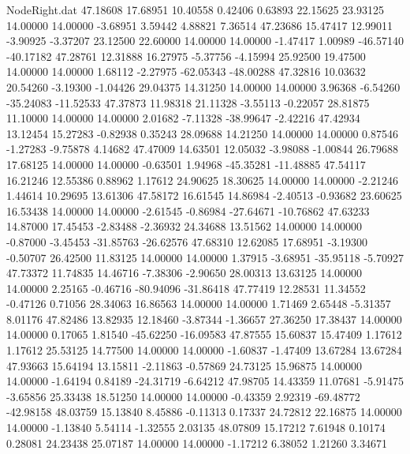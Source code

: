 \begin{filecontents}{NodeRight.dat}
  47.18608   17.68951   10.40558     0.42406    0.63893   22.15625   23.93125   14.00000   14.00000   -3.68951    3.59442    4.88821    7.36514
  47.23686   15.47417   12.99011    -3.90925   -3.37207   23.12500   22.60000   14.00000   14.00000   -1.47417    1.00989  -46.57140  -40.17182
  47.28761   12.31888   16.27975    -5.37756   -4.15994   25.92500   19.47500   14.00000   14.00000    1.68112   -2.27975  -62.05343  -48.00288
  47.32816   10.03632   20.54260    -3.19300   -1.04426   29.04375   14.31250   14.00000   14.00000    3.96368   -6.54260  -35.24083  -11.52533
  47.37873   11.98318   21.11328    -3.55113   -0.22057   28.81875   11.10000   14.00000   14.00000    2.01682   -7.11328  -38.99647   -2.42216
  47.42934   13.12454   15.27283    -0.82938    0.35243   28.09688   14.21250   14.00000   14.00000    0.87546   -1.27283   -9.75878    4.14682
  47.47009   14.63501   12.05032    -3.98088   -1.00844   26.79688   17.68125   14.00000   14.00000   -0.63501    1.94968  -45.35281  -11.48885
  47.54117   16.21246   12.55386     0.88962    1.17612   24.90625   18.30625   14.00000   14.00000   -2.21246    1.44614   10.29695   13.61306
  47.58172   16.61545   14.86984    -2.40513   -0.93682   23.60625   16.53438   14.00000   14.00000   -2.61545   -0.86984  -27.64671  -10.76862
  47.63233   14.87000   17.45453    -2.83488   -2.36932   24.34688   13.51562   14.00000   14.00000   -0.87000   -3.45453  -31.85763  -26.62576
  47.68310   12.62085   17.68951    -3.19300   -0.50707   26.42500   11.83125   14.00000   14.00000    1.37915   -3.68951  -35.95118   -5.70927
  47.73372   11.74835   14.46716    -7.38306   -2.90650   28.00313   13.63125   14.00000   14.00000    2.25165   -0.46716  -80.94096  -31.86418
  47.77419   12.28531   11.34552    -0.47126    0.71056   28.34063   16.86563   14.00000   14.00000    1.71469    2.65448   -5.31357    8.01176
  47.82486   13.82935   12.18460    -3.87344   -1.36657   27.36250   17.38437   14.00000   14.00000    0.17065    1.81540  -45.62250  -16.09583
  47.87555   15.60837   15.47409     1.17612    1.17612   25.53125   14.77500   14.00000   14.00000   -1.60837   -1.47409   13.67284   13.67284
  47.93663   15.64194   13.15811    -2.11863   -0.57869   24.73125   15.96875   14.00000   14.00000   -1.64194    0.84189  -24.31719   -6.64212
  47.98705   14.43359   11.07681    -5.91475   -3.65856   25.33438   18.51250   14.00000   14.00000   -0.43359    2.92319  -69.48772  -42.98158
  48.03759   15.13840    8.45886    -0.11313    0.17337   24.72812   22.16875   14.00000   14.00000   -1.13840    5.54114   -1.32555    2.03135
  48.07809   15.17212    7.61948     0.10174    0.28081   24.23438   25.07187   14.00000   14.00000   -1.17212    6.38052    1.21260    3.34671

\end{filecontents}
